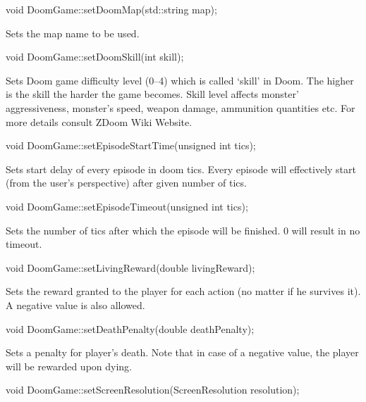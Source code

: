 \vspace{20pt}
\begin{clinee}
void DoomGame::setDoomMap(std::string map);
\end{clinee}
	Sets the map name to be used.


\vspace{20pt}
\begin{clinee}      
void DoomGame::setDoomSkill(int skill);
\end{clinee}
	Sets Doom game difficulty level (0--4) which is called `skill' in Doom. The higher is the skill the harder the game becomes. Skill level affects monster' aggressiveness, monster's speed, weapon damage, ammunition quantities etc. For more details consult ZDoom Wiki Website\cite{zdoom-wiki}.


\vspace{20pt}
\begin{clinee}    
void DoomGame::setEpisodeStartTime(unsigned int tics);
\end{clinee}

Sets start delay of every episode in doom tics. Every episode will effectively start (from the user's perspective) after given number of tics.


\vspace{20pt}
\begin{clinee}
void DoomGame::setEpisodeTimeout(unsigned int tics);
\end{clinee}

Sets the number of tics after which the episode will be finished. 0 will result in no timeout.


\vspace{20pt}
\begin{clinee}
void DoomGame::setLivingReward(double livingReward);
\end{clinee}

Sets the reward granted to the player for each action (no matter if he survives it). A negative value is also allowed.


\vspace{20pt}
\begin{clinee}
void DoomGame::setDeathPenalty(double deathPenalty);
\end{clinee}

	Sets a penalty for player's death. Note that in case of a negative value, the player will be rewarded upon dying.


\vspace{20pt}
\begin{clinee}
void DoomGame::setScreenResolution(ScreenResolution resolution);
\end{clinee}

